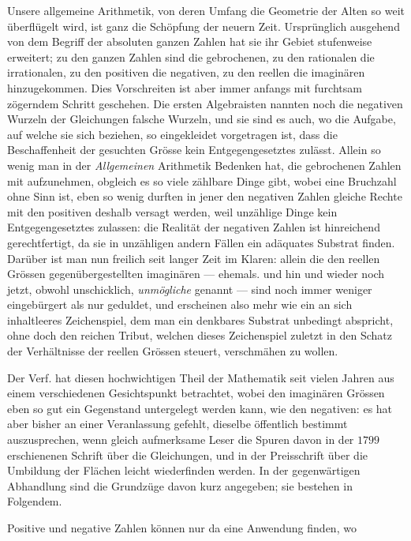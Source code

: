 Unsere allgemeine Arithmetik, von deren Umfang die Geometrie der Alten so weit überflügelt wird, ist ganz die Schöpfung der neuern Zeit. Ursprünglich ausgehend von dem Begriff der absoluten ganzen Zahlen hat sie ihr Gebiet stufenweise erweitert; zu den ganzen Zahlen sind die gebrochenen, zu den rationalen die irrationalen, zu den positiven die negativen, zu den reellen die imaginären hinzugekommen. Dies Vorschreiten ist aber immer anfangs mit furchtsam zögerndem Schritt geschehen. Die ersten Algebraisten nannten noch die negativen Wurzeln der Gleichungen falsche Wurzeln, und sie sind es auch, wo die Aufgabe, auf welche sie sich beziehen, so eingekleidet vorgetragen ist, dass die Beschaffenheit der gesuchten Grösse kein Entgegengesetztes zulässt. Allein so wenig man in der \emph{Allgemeinen} Arithmetik Bedenken hat, die gebrochenen Zahlen mit aufzunehmen, obgleich es so viele zählbare Dinge gibt, wobei eine Bruchzahl ohne Sinn ist, eben so wenig durften in jener den negativen Zahlen gleiche Rechte mit den positiven deshalb versagt werden, weil unzählige Dinge kein Entgegengesetztes zulassen: die Realität der negativen Zahlen ist hinreichend gerechtfertigt, da sie in unzähligen andern Fällen ein adäquates Substrat finden. Darüber ist man nun freilich seit langer Zeit im Klaren: allein die den reellen Grössen gegenübergestellten imaginären --- ehemals. und hin und wieder noch jetzt, obwohl unschicklich, \emph{unmögliche} genannt --- sind noch immer weniger eingebürgert als nur geduldet, und erscheinen also mehr wie ein an sich inhaltleeres Zeichenspiel, dem man ein denkbares Substrat unbedingt abspricht, ohne doch den reichen Tribut, welchen dieses Zeichenspiel zuletzt in den Schatz der Verhältnisse der reellen Grössen steuert, verschmähen zu wollen.

Der Verf. hat diesen hochwichtigen Theil der Mathematik seit vielen Jahren aus einem verschiedenen Gesichtspunkt betrachtet, wobei den imaginären Grössen eben so gut ein Gegenstand untergelegt werden kann, wie den negativen: es hat aber bisher an einer Veranlassung gefehlt, dieselbe öffentlich bestimmt auszusprechen, wenn gleich aufmerksame Leser die Spuren davon in der $1799$ erschienenen Schrift über die Gleichungen, und in der Preisschrift über die Umbildung der Flächen leicht wiederfinden werden. In der gegenwärtigen Abhandlung sind die Grundzüge davon kurz angegeben; sie bestehen in Folgendem.

Positive und negative Zahlen können nur da eine Anwendung finden, wo
